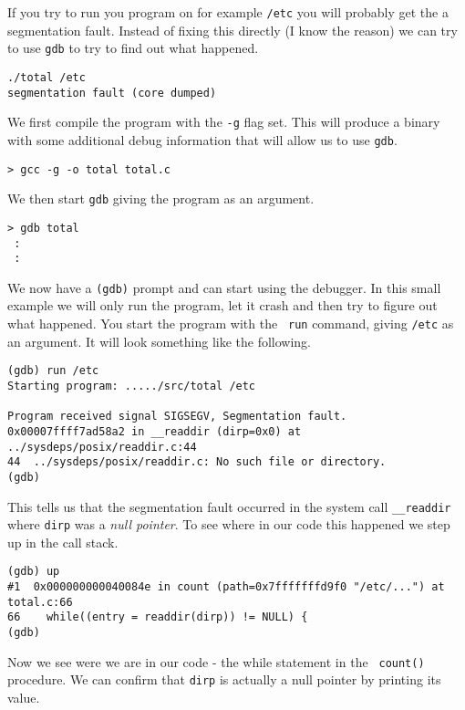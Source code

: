 \documentclass[a4paper,11pt]{article}
\begin{document}
If you try to run you program on for example {\tt /etc} you will
probably get the a segmentation fault. Instead of fixing this directly
(I know the reason) we can try to use {\tt gdb} to try to find out what
happened.

\begin{verbatim}
./total /etc
segmentation fault (core dumped)
\end{verbatim}

We first compile the program with the {\tt -g} flag set. This will
produce a binary with some additional debug information that will
allow us to use {\tt gdb}.

\begin{verbatim}
> gcc -g -o total total.c
\end{verbatim}

We then start {\tt gdb} giving the program as an argument.

\begin{verbatim}
> gdb total
 :
 :
\end{verbatim}

We now have a {\tt (gdb)} prompt and can start using the debugger. In
this small example we will only run the program, let it crash and then
try to figure out what happened. You start the program with the {\tt
  run} command, giving {\tt /etc} as an argument. It will look
something like the following.


\begin{verbatim}
(gdb) run /etc
Starting program: ...../src/total /etc

Program received signal SIGSEGV, Segmentation fault.
0x00007ffff7ad58a2 in __readdir (dirp=0x0) at ../sysdeps/posix/readdir.c:44
44	../sysdeps/posix/readdir.c: No such file or directory.
(gdb) 
\end{verbatim} 

This tells us that the segmentation fault occurred in the system call
{\tt \_\_readdir} where {\tt dirp} was a {\em null pointer}. To see
where in our code this happened we step up in the call stack.

\begin{verbatim}
(gdb) up
#1  0x000000000040084e in count (path=0x7fffffffd9f0 "/etc/...") at total.c:66
66	  while((entry = readdir(dirp)) != NULL) {
(gdb) 
\end{verbatim}

Now we see were we are in our code - the while statement in the {\tt
  count()} procedure. We can confirm that {\tt dirp} is actually a
null pointer by printing its value. 
\end{document}
